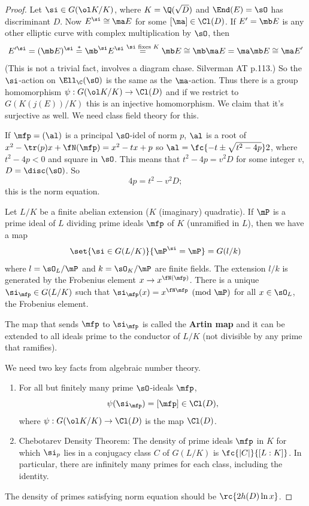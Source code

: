 \begin{proof}
Let $\si\in G(\ol K/K)$, where $K=\Q(\sqrt D)$ and $\End(E)=\sO$ has discriminant $D$. Now $E^{\si}\cong \ma E$ for some $[\ma]\in \Cl(D)$. If $E'=\mb E$ is any other elliptic curve with complex multiplication by $\sO$, then
\[
E'^{\si}= (\mb E)^{\si}\stackrel{*}{=}\mb^{\si}E^{\si}\stackrel{\si\text{ fixes }K}{=}\mb E\cong \mb\ma E=\ma\mb E\cong \ma E'
\]
(This is not a trivial fact, involves a diagram chase. Silverman AT p.113.)
So the $\si$-action on $\Ell_{\C}(\sO)$ is the same as the $\ma$-action. Thus there is a group homomorphism $\psi:G(\ol K/K)\to \Cl(D)$ and if we restrict to $G(K(j(E))/K)$ this is an injective homomorphism. We claim that it's surjective as well. We need class field theory for this.

\begin{rem}
If $\mfp=(\al)$ is a principal $\sO$-idel of norm $p$, $\al$ is a root of $x^2-\tr(p)x+\fN(\mfp)=x^2-tx+p$ so $\al=\fc{-t\pm \sqrt{t^2-4p}}2$, where $t^2-4p<0$ and square in $\sO$. This means that $t^2-4p=v^2D$ for some integer $v$, $D=\disc(\sO)$. So 
\[
4p=t^2-v^2D;
\]
this is the norm equation.
\end{rem}
Let $L/K$ be a finite abelian extension ($K$ (imaginary) quadratic). If $\mP$ is a prime ideal of $L$ dividing prime ideals $\mfp$  of $K$ (unramified in $L$), then we have a map
\[
\set{\si\in G(L/K)}{\mP^{\si}=\mP}=G(l/k)
\]
where $l=\sO_L/\mP$ and $k=\sO_K/\mP$ are finite fields. The extension $l/k$ is generated by the Frobenius element $x\to x^{\fN(\mfp)}$. There is a unique $\si_{\mfp}\in G(L/K)$ such that $\si_{\mfp}(x)=x^{\fN \mfp}\pmod{\mP}$ for all $x\in \sO_L$, the Frobenius element. %

The map that sends $\mfp$ to $\si_{\mfp}$ is called the \textbf{Artin map} and it can be extended to all ideals prime to the conductor of $L/K$ (not divisible by any prime that ramifies).

We need two key facts from algebraic number theory.
\begin{enumerate}
\item
For all but finitely many prime $\sO$-ideals $\mfp$,
\[
\psi(\si_{\mfp})=[\mfp]\in \Cl(D),
\]
where $\psi:G(\ol K/K)\to \Cl(D)$ is the map $\Cl(D)$. 
\item
Chebotarev Density Theorem: The density of prime ideals $\mfp$ in $K$ for which $\si_p$ lies in a conjugacy class $C$ of $G(L/K)$ is $\fc{|C|}{[L:K]}$. In particular, there are infinitely many primes for each class, including the identity.
\end{enumerate}
The density of primes satisfying norm equation should be $\rc{2h(D)\ln x}$.
\end{proof}
